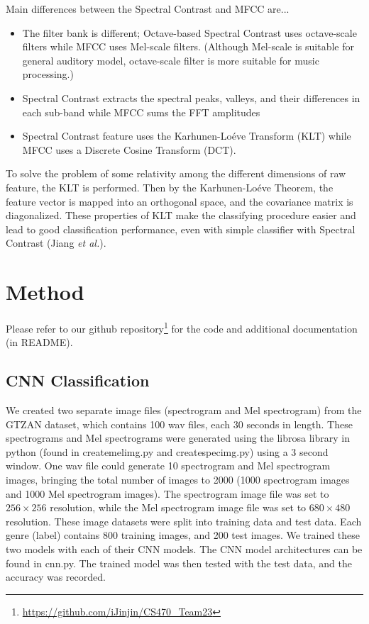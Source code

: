 \documentclass{article}
\theoremstyle{plain}
\theoremstyle{definition}
\theoremstyle{remark}
\begin{document}
Main differences between the Spectral Contrast and MFCC are...

\begin{itemize}
	\item The filter bank is different; Octave-based Spectral Contrast uses octave-scale filters while MFCC uses Mel-scale filters.
	(Although Mel-scale is suitable for general auditory model, octave-scale filter is more suitable for music processing.)
	
	\item Spectral Contrast extracts the spectral peaks, valleys, and their differences in each sub-band while MFCC sums the FFT amplitudes
	
	\item Spectral Contrast feature uses the Karhunen-Lo\'eve Transform (KLT) while MFCC uses a Discrete Cosine Transform (DCT).
\end{itemize}

To solve the problem of some relativity among the different dimensions of raw feature, the KLT is performed.
Then by the Karhunen-Lo\'eve Theorem, the feature vector is mapped into an orthogonal space, and the covariance matrix is diagonalized.
These properties of KLT make the classifying procedure easier and lead to good classification performance, even with simple classifier with Spectral Contrast (Jiang {\it et al.}).


\section{Method}

Please refer to our github repository\footnote{\url{https://github.com/iJinjin/CS470_Team23}} for the code and additional documentation (in README).

\subsection{CNN Classification}
We created two separate image files (spectrogram and Mel spectrogram) from the GTZAN dataset, which contains 100 wav files, each 30 seconds in length. These spectrograms and Mel spectrograms were generated using the librosa library in python (found in createmelimg.py and createspecimg.py) using a 3 second window. One wav file could generate 10 spectrogram and Mel spectrogram images, bringing the total number of images to 2000 (1000 spectrogram images and 1000 Mel spectrogram images). The spectrogram image file was set to $256 \times 256$ resolution, while the Mel spectrogram image file was set to $680 \times 480$ resolution. These image datasets were split into training data and test data. Each genre (label) contains 800 training images, and 200 test images. We trained these two models with each of their CNN models. The CNN model architectures can be found in cnn.py. The trained model was then tested with the test data, and the accuracy was recorded.  
\end{document}
